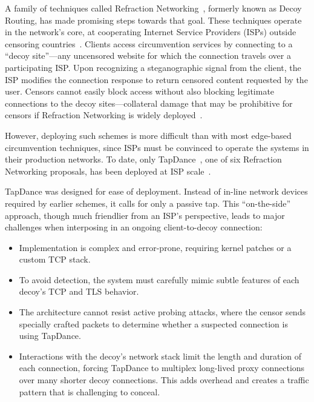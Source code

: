 \documentclass[sigconf]{acmart}
\begin{document}

A family of techniques called Refraction Networking~\cite{telex11,cirripede11,curveball11,tapdance14,rebound15,slitheen16,waterfall17}, formerly known
as Decoy Routing, has made promising steps towards that goal.
These techniques operate in the network's core, at cooperating Internet Service Providers
(ISPs) outside censoring countries~\cite{refraction-site}.  Clients access circumvention services by connecting to a ``decoy site''---any uncensored website for which the connection travels over a participating ISP\@.  Upon recognizing a steganographic signal from the client, the ISP modifies the connection response to return censored content requested by the user.
Censors cannot easily block access without also blocking legitimate connections to the decoy sites---collateral damage that may be prohibitive for censors if Refraction Networking is widely deployed~\cite{robinson2013collateral}.

However, deploying such schemes is more difficult than with most
edge-based circumvention techniques, since ISPs must be convinced to
operate the systems in their production networks.  To date, only
TapDance~\cite{tapdance14}, one of six Refraction Networking
proposals, has been deployed at ISP scale~\cite{frolov2017isp}.

TapDance was designed for ease of deployment.
Instead of in-line network devices required by earlier schemes, it
calls for only a passive tap.
This ``on-the-side'' approach, though much friendlier from an ISP's
perspective, leads to major challenges when interposing in an ongoing
client-to-decoy connection:

\begin{itemize}
\item Implementation is complex and error-prone, requiring kernel
  patches or a custom TCP stack.
\item To avoid detection, the system must carefully mimic
  subtle features of each decoy's TCP and TLS behavior.
\item The architecture cannot resist active probing attacks, where the
  censor sends specially crafted packets to determine whether a
  suspected connection is using TapDance.
\item Interactions with the decoy's network stack limit the length and
  duration of each connection, forcing TapDance to multiplex
  long-lived proxy connections over many shorter decoy
  connections. This adds overhead and creates a traffic pattern
  that is challenging to conceal.
\end{itemize}
\end{document}
